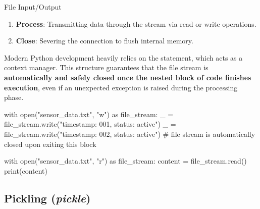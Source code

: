 \documentclass[10pt]{article}
\begin{document}
\begin{core}{File Input/Output}
\begin{enumerate}
\begin{itemize}
        \end{itemize}

        If working with binary files, simply append  to the end: , , , 

        \item \textbf{Process}: Transmitting data through the stream via read or write operations.

        \item \textbf{Close}: Severing the connection to flush internal memory.

      \end{enumerate}

      Modern Python development heavily relies on the  statement, which acts as a context manager. This structure guarantees that the file stream is \textbf{automatically and safely closed once the nested block of code finishes execution}, even if an unexpected exception is raised during the processing phase.

      \begin{pyconsole}

        with open("sensor_data.txt", "w") as file_stream:
            _ = file_stream.write("timestamp: 001, status: active\n")
            _ = file_stream.write("timestamp: 002, status: active\n")
            # file stream is automatically closed upon exiting this block

        with open("sensor_data.txt", "r") as file_stream:
            content = file_stream.read()
            print(content)

      \end{pyconsole}

    \end{core}

  \subsection{Pickling (\textit{pickle})}
\end{document}

